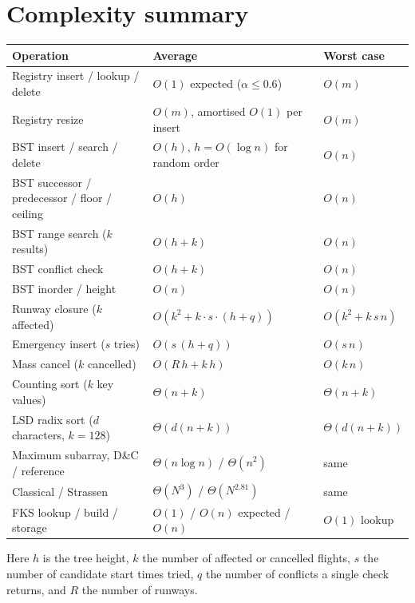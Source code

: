 \documentclass[11pt]{article}
\begin{document}
\section{Complexity summary}

\begin{center}
\begin{tabular}{@{}lll@{}}
\toprule
Operation & Average & Worst case \\
\midrule
Registry insert / lookup / delete & $O(1)$ expected ($\alpha \le 0.6$) & $O(m)$ \\
Registry resize & $O(m)$, amortised $O(1)$ per insert & $O(m)$ \\
BST insert / search / delete & $O(h)$, $h = O(\log n)$ for random order & $O(n)$ \\
BST successor / predecessor / floor / ceiling & $O(h)$ & $O(n)$ \\
BST range search ($k$ results) & $O(h + k)$ & $O(n)$ \\
BST conflict check & $O(h + k)$ & $O(n)$ \\
BST inorder / height & $O(n)$ & $O(n)$ \\
\midrule
Runway closure ($k$ affected) & $O(k^2 + k \cdot s \cdot (h + q))$ & $O(k^2 + k\,s\,n)$ \\
Emergency insert ($s$ tries) & $O(s\,(h+q))$ & $O(s\,n)$ \\
Mass cancel ($k$ cancelled) & $O(R\,h + k\,h)$ & $O(k\,n)$ \\
Counting sort ($k$ key values) & $\Theta(n+k)$ & $\Theta(n+k)$ \\
LSD radix sort ($d$ characters, $k=128$) & $\Theta(d(n+k))$ & $\Theta(d(n+k))$ \\
Maximum subarray, D\&C / reference & $\Theta(n\log n)$ / $\Theta(n^2)$ & same \\
Classical / Strassen & $\Theta(N^3)$ / $\Theta(N^{2.81})$ & same \\
FKS lookup / build / storage & $O(1)$ / $O(n)$ expected / $O(n)$ & $O(1)$ lookup \\
\bottomrule
\end{tabular}
\end{center}

Here $h$ is the tree height, $k$ the number of affected or cancelled flights, $s$ the number of candidate start times tried, $q$ the number of conflicts a single check returns, and $R$ the number of runways.
\end{document}
